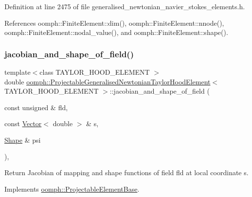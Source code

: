 Definition at line 2475 of file generalised\+\_\+newtonian\+\_\+navier\+\_\+stokes\+\_\+elements.\+h.



References oomph\+::\+Finite\+Element\+::dim(), oomph\+::\+Finite\+Element\+::nnode(), oomph\+::\+Finite\+Element\+::nodal\+\_\+value(), and oomph\+::\+Finite\+Element\+::shape().

\mbox{\label{classoomph_1_1ProjectableGeneralisedNewtonianTaylorHoodElement_a14569ba6c03489a0ad3cee644794ee2e}} 
\subsubsection{\texorpdfstring{jacobian\+\_\+and\+\_\+shape\+\_\+of\+\_\+field()}{jacobian\_and\_shape\_of\_field()}}
{\footnotesize\ttfamily template$<$class T\+A\+Y\+L\+O\+R\+\_\+\+H\+O\+O\+D\+\_\+\+E\+L\+E\+M\+E\+NT $>$ \\
double \hyperlink{classoomph_1_1ProjectableGeneralisedNewtonianTaylorHoodElement}{oomph\+::\+Projectable\+Generalised\+Newtonian\+Taylor\+Hood\+Element}$<$ T\+A\+Y\+L\+O\+R\+\_\+\+H\+O\+O\+D\+\_\+\+E\+L\+E\+M\+E\+NT $>$\+::jacobian\+\_\+and\+\_\+shape\+\_\+of\+\_\+field (\begin{DoxyParamCaption}\item[{const unsigned \&}]{fld,  }\item[{const \hyperlink{classoomph_1_1Vector}{Vector}$<$ double $>$ \&}]{s,  }\item[{\hyperlink{classoomph_1_1Shape}{Shape} \&}]{psi }\end{DoxyParamCaption})\hspace{0.3cm}{\ttfamily [inline]}, {\ttfamily [virtual]}}



Return Jacobian of mapping and shape functions of field fld at local coordinate s. 



Implements \hyperlink{classoomph_1_1ProjectableElementBase_ad45c21b58c0985d52f68ab2d79cbb488}{oomph\+::\+Projectable\+Element\+Base}.



